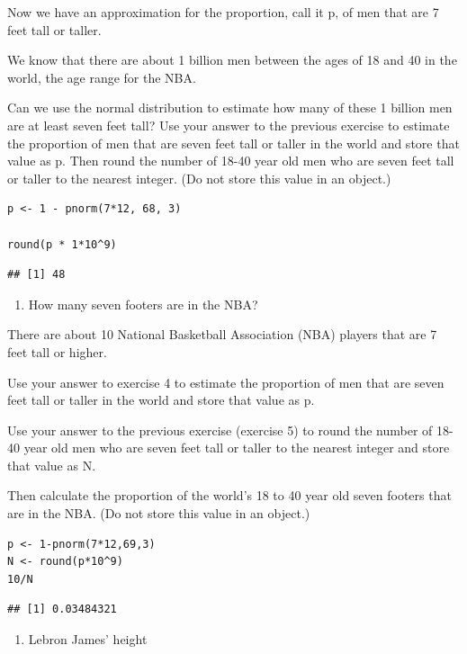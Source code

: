 \documentclass[
]{article}
\providecommand{\tightlist}{%
  \setlength{\itemsep}{0pt}\setlength{\parskip}{0pt}}
\begin{document}
Now we have an approximation for the proportion, call it p, of men that
are 7 feet tall or taller.

We know that there are about 1 billion men between the ages of 18 and 40
in the world, the age range for the NBA.

Can we use the normal distribution to estimate how many of these 1
billion men are at least seven feet tall? Use your answer to the
previous exercise to estimate the proportion of men that are seven feet
tall or taller in the world and store that value as p. Then round the
number of 18-40 year old men who are seven feet tall or taller to the
nearest integer. (Do not store this value in an object.)

\begin{verbatim}
p <- 1 - pnorm(7*12, 68, 3)

round(p * 1*10^9)
\end{verbatim}

\begin{verbatim}
## [1] 48
\end{verbatim}

\begin{enumerate}
\def\labelenumi{\arabic{enumi}.}
\setcounter{enumi}{5}
\tightlist
\item
  How many seven footers are in the NBA?
\end{enumerate}

There are about 10 National Basketball Association (NBA) players that
are 7 feet tall or higher.

Use your answer to exercise 4 to estimate the proportion of men that are
seven feet tall or taller in the world and store that value as p.~

Use your answer to the previous exercise (exercise 5) to round the
number of 18-40 year old men who are seven feet tall or taller to the
nearest integer and store that value as N.

Then calculate the proportion of the world's 18 to 40 year old seven
footers that are in the NBA. (Do not store this value in an object.)

\begin{verbatim}
p <- 1-pnorm(7*12,69,3)
N <- round(p*10^9)
10/N
\end{verbatim}

\begin{verbatim}
## [1] 0.03484321
\end{verbatim}

\begin{enumerate}
\def\labelenumi{\arabic{enumi}.}
\setcounter{enumi}{6}
\tightlist
\item
  Lebron James' height
\end{enumerate}
\end{document}
